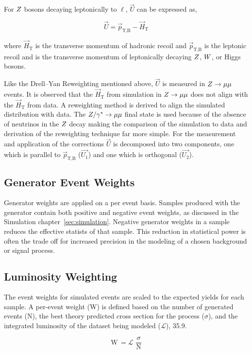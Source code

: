 For $Z$ bosons decaying leptonically to $\ell$, $\vec{U}$ can be expressed as,

\begin{equation}
\vec{U} = \vec{p}_{\text{T,B}} - \vec{H}_{\text{T}}
\end{equation}

where $\vec{H}_{\text{T}}$ is the transverse momentum of hadronic recoil and $\vec{p}_{\text{T,B}}$
is the leptonic recoil and is the transverse momentum of leptonically decaying $Z$, $W$, or Higgs bosons.

Like the Drell--Yan Reweighting mentioned above, $\vec{U}$ is measured in $Z\to\mu\mu$ events.
It is observed that the $\vec{H}_{\text{T}}$ from simulation in $Z\to\mu\mu$ does not align with
the $\vec{H}_{\text{T}}$ from data. A reweighting method is derived to align the simulated distribution with 
data. The $Z/\gamma^*\to\mu\mu$
final state is used because of the absence of neutrinos in the $Z$ decay making the comparison of
the simulation to data and derivation of the reweighting technique far more simple. For the measurement
and application of the corrections $\vec{U}$ is decomposed into two components, one which is
parallel to $\vec{p}_{\text{T,B}}$ ($\vec{U_{1}}$) and one which is orthogonal ($\vec{U_{2}}$).


\subsection{Generator Event Weights}
Generator weights are applied on a per event basis. Samples produced with the \MGAMCNLO generator
contain both positive and negative event weights, as discussed in the Simulation chapter~\ref{sec:simulation}.
Negative generator weights in a sample reduces the effective statists of that sample. This reduction
in statistical power is often the trade off for increased precision in the modeling of a chosen
background or signal process.


\subsection{Luminosity Weighting}
The event weights for simulated events are scaled to the expected yields for each sample. A per-event
weight (W) is defined based on the number of generated events (N), the best theory predicted cross section
for the process ($\sigma$), and the integrated luminosity of the dataset being modeled 
($\mathcal{L}$), 35.9\fbinv.

\begin{equation}
\text{W} \, = \mathcal{L} \, \,  \frac{\sigma}{\text{N}}
\end{equation}


